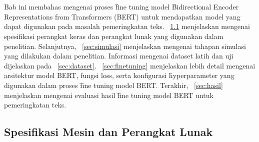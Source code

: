 \chapter{\babEmpat}
\label{bab:4}

Bab ini membahas mengenai proses \f{fine tuning} model \f{Bidirectional Encoder Representations from Transformers} (BERT) untuk mendapatkan model yang dapat digunakan pada masalah pemeringkatan teks.
\sect~\ref{sec:spesifikasi} menjelaskan mengenai spesifikasi perangkat keras dan perangkat lunak yang digunakan dalam penelitian. Selanjutnya, \sect~\ref{sec:simulasi} menjelaskan mengenai tahapan simulasi yang dilakukan dalam penelitian. Informasi mengenai \f{dataset} latih dan uji  dijelaskan pada \sect~\ref{sec:dataset}. \sect~\ref{sec:finetuning} menjelaskan lebih detail mengenai arsitektur model BERT, fungsi loss, serta konfigurasi \f{hyperparameter} yang digunakan dalam proses \f{fine tuning} model BERT. Terakhir, \sect~\ref{sec:hasil} menjelaskan mengenai evaluasi hasil \f{fine tuning} model BERT untuk pemeringkatan teks.

\section{Spesifikasi Mesin dan Perangkat Lunak}
\label{sec:spesifikasi}

